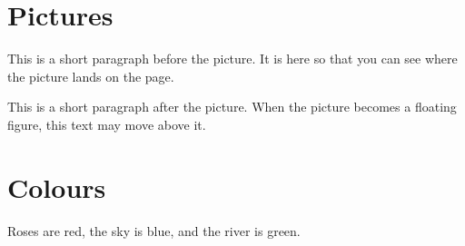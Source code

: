 \documentclass{article}
\begin{document}
\section{Pictures}
This is a short paragraph before the picture. It is here so that you can
see where the picture lands on the page.


This is a short paragraph after the picture. When the picture becomes a
floating figure, this text may move above it.

\section{Colours}
Roses are red, the sky is blue, and the river is green.
\end{document}
